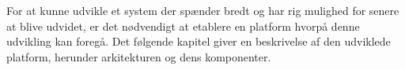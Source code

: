 For at kunne udvikle et system der spænder bredt og har rig mulighed for senere at blive udvidet, er det nødvendigt at etablere en platform hvorpå denne udvikling kan foregå.
Det følgende kapitel giver en beskrivelse af den udviklede platform, herunder arkitekturen og dens komponenter.